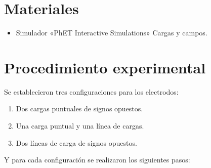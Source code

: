 \documentclass[letter,11pt]{article}
\begin{document}
\section{Materiales}
\begin{itemize}
\item Simulador «PhET Interactive Simulations» Cargas y campos.
\end{itemize}

\section{Procedimiento experimental}
Se establecieron tres configuraciones para los electrodos:

\begin{enumerate}
\item Dos cargas puntuales de signos opuestos.
\item Una carga puntual y una línea de cargas.
\item Dos líneas de carga de signos opuestos.
\end{enumerate}

Y para cada configuración se realizaron los siguientes pasos:
\end{document}

